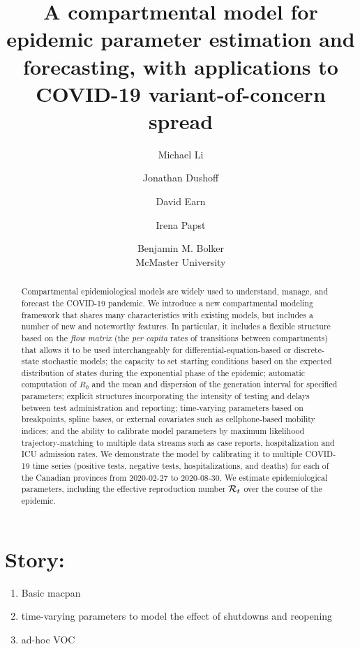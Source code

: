 \documentclass[12pt]{article}\usepackage[]{graphicx}\usepackage[]{color}
\title{A compartmental model for epidemic parameter estimation and forecasting, with applications to COVID-19 variant-of-concern spread}
\author{Michael Li \and Jonathan Dushoff \and David Earn \and Irena Papst \and Benjamin M. Bolker \\
  McMaster University\\
}
\begin{document}
\linenumbers
\maketitle

\section*{Story:}
\begin{enumerate}
\item{Basic macpan}
\item{time-varying parameters to model the effect of shutdowns and reopening}
\item{ad-hoc VOC}
\end{enumerate}

\begin{abstract}
  Compartmental epidemiological models are widely used to understand, 
  manage, and forecast the COVID-19 pandemic. We introduce a new
  compartmental modeling framework that shares many characteristics with existing
  models, but includes a number of new and noteworthy features.
  In particular, it includes a flexible structure based on the \emph{flow matrix}
  (the \emph{per capita} rates of transitions between compartments) that allows
  it to be used interchangeably for differential-equation-based or discrete-state
  stochastic models; the capacity to set starting conditions based on the expected
  distribution of states during the exponential phase of the epidemic; automatic computation
  of $R_0$ and the mean and dispersion of the generation interval for specified
  parameters; explicit structures incorporating the intensity of testing and delays
  between test administration and reporting; time-varying parameters based on
  breakpoints, spline bases, or external covariates such as cellphone-based mobility indices;
  and the ability to calibrate model parameters by maximum likelihood
  trajectory-matching to multiple data streams such as
  case reports, hospitalization and ICU admission rates.
  We demonstrate the model by calibrating it to multiple COVID-19 time series (positive tests, negative 
  tests, hospitalizations, and deaths) for each of the Canadian
  provinces from 2020-02-27 to 2020-08-30.  We
  estimate epidemiological parameters, including the effective
  reproduction number ${\mathcal R}_t$ over the course of the epidemic.
\end{abstract}

\end{document}
